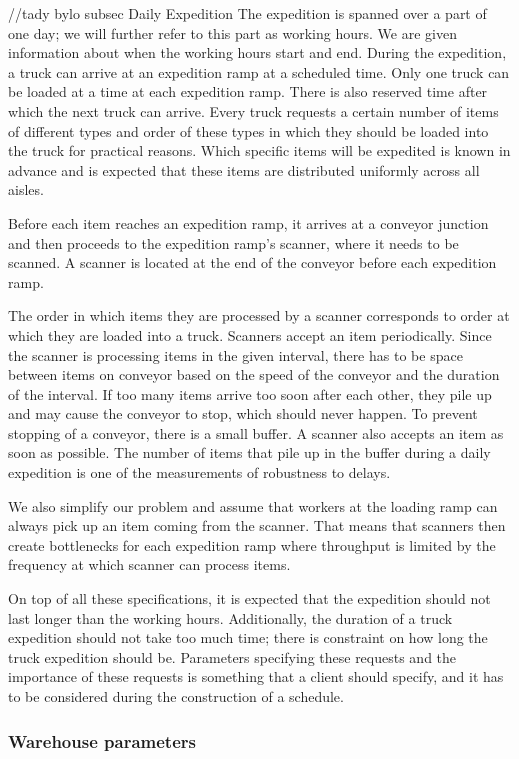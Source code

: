 \documentclass{ctuthesis}
\begin{document}
//tady bylo subsec Daily Expedition
The expedition is spanned over a part of one day; we will further refer to this part as working hours. We are given information about when the working hours start and end. During the expedition, a truck can arrive at an expedition ramp at a scheduled time. Only one truck can be loaded at a time at each expedition ramp. There is also reserved time after which the next truck can arrive. Every truck requests a certain number of items of different types and order of these types in which they should be loaded into the truck for practical reasons. Which specific items will be expedited is known in advance and is expected that these items are distributed uniformly across all aisles. 

Before each item reaches an expedition ramp, it arrives at a conveyor junction and then proceeds to the expedition ramp's scanner, where it needs to be scanned. A scanner is located at the end of the conveyor before each expedition ramp. 

The order in which items they are processed by a scanner corresponds to order at which they are loaded into a truck. Scanners accept an item periodically. Since the scanner is processing items in the given interval, there has to be space between items on conveyor based on the speed of the conveyor and the duration of the interval. If too many items arrive too soon after each other, they pile up and may cause the conveyor to stop, which should never happen. To prevent stopping of a conveyor, there is a small buffer. A scanner also accepts an item as soon as possible. The number of items that pile up in the buffer during a daily expedition is one of the measurements of robustness to delays.

We also simplify our problem and assume that workers at the loading ramp can always pick up an item coming from the scanner. That means that scanners then create bottlenecks for each expedition ramp where throughput is limited by the frequency at which scanner can process items.

On top of all these specifications, it is expected that the expedition should not last longer than the working hours. Additionally, the duration of a truck expedition should not take too much time; there is constraint on how long the truck expedition should be. Parameters specifying these requests and the importance of these requests is something that a client should specify, and it has to be considered during the construction of a schedule.

\subsubsection{Warehouse parameters}
\end{document}
